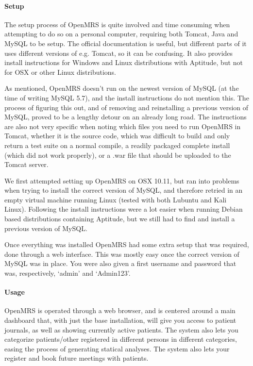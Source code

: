 \documentclass{article}
\begin{document}
  \paragraph{Setup}

  The setup process of OpenMRS is quite involved and time consuming when
  attempting to do so on a personal computer, requiring both Tomcat, Java and
  MySQL to be setup. The official documentation is useful, but different parts
  of it uses different versions of e.g. Tomcat, so it can be confusing.
  It also provides install instructions for Windows and Linux distributions
  with Aptitude, but not for OSX or other Linux distributions. 

  As mentioned, OpenMRS doesn't run on the newest version of MySQL (at the time
  of writing MySQL 5.7), and the install instructions do not mention this. The
  process of figuring this out, and of removing and reinstalling a previous
  version of MySQL, proved to be a lengthy detour on an already long road.
  The instructions are also not very specific when noting which files you need
  to run OpenMRS in Tomcat, whether it is the source code, which was difficult
  to build and only return a test suite on a normal compile, a readily packaged
  complete install (which did not work properly), or a .war file that should be
  uploaded to the Tomcat server.

  We first attempted setting up OpenMRS on OSX 10.11, but ran into problems when
  trying to install the correct version of MySQL, and therefore retried in an
  empty virtual machine running Linux (tested with both Lubuntu and Kali Linux).
  Following the install instructions were a lot easier when running Debian based
  distributions containing Aptitude, but we still had to find and install a
  previous version of MySQL. 

  Once everything was installed OpenMRS had some extra setup that was required,
  done through a web interface. This was mostly easy once the correct version of
  MySQL was in place. You were also given a first username and password that
  was, respectively, `admin' and `Admin123'.

  \paragraph{Usage}

  OpenMRS is operated through a web browser, and is centered around a main dashboard that,
  with just the base installation, will give you access to patient journals, as well as
  showing currently active patients. The system also lets you categorize patients/other registered
  in different persons in different categories, easing the process of generating statical analyses.
  The system also lets your register and book future meetings with patients.
\end{document}
